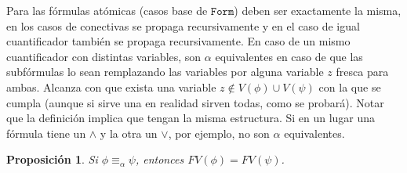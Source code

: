 \documentclass[a4paper, 12pt]{report}
\newtheorem{prop}[teorema]{Proposición}
\theoremstyle{definition}
\begin{document}
Para las fórmulas atómicas (casos base de $\mathtt{Form}$) deben ser exactamente la misma, en los casos de conectivas se propaga recursivamente y en el caso de igual cuantificador también se propaga recursivamente. En caso de un mismo cuantificador con distintas variables, son $\alpha$ equivalentes en caso de que las subfórmulas lo sean remplazando las variables por alguna variable $z$ fresca para ambas. Alcanza con que exista una variable $z\not\in V(\phi)\cup V(\psi)$ con la que se cumpla (aunque si sirve una en realidad sirven todas, como se probará). Notar que la definición implica que tengan la misma estructura. Si en un lugar una fórmula tiene un $\wedge$ y la otra un $\vee$, por ejemplo, no son $\alpha$ equivalentes.

\begin{prop}\label{prop-alphaEqFV}
	Si $\phi\equiv_\alpha\psi$, entonces $FV(\phi)=FV(\psi)$.
\end{prop}
\end{document}

